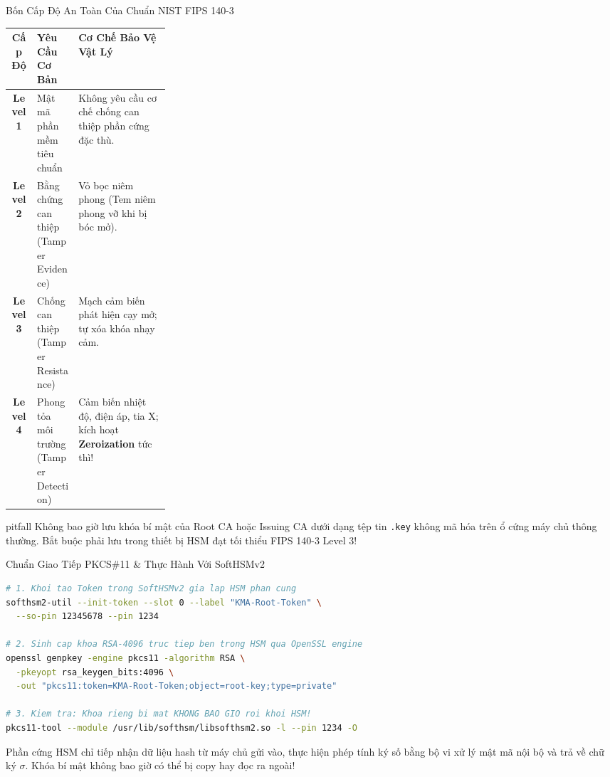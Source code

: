 \begin{frame}{Bốn Cấp Độ An Toàn Của Chuẩn NIST FIPS 140-3}
  \begin{table}[h]
    \centering\scriptsize
    \begin{tabularx}{\linewidth}{@{}c p{0.26\linewidth} X@{}}
      \toprule
      \textbf{Cấp Độ} & \textbf{Yêu Cầu Cơ Bản} & \textbf{Cơ Chế Bảo Vệ Vật Lý} \\
      \midrule
      \textbf{Level 1} & Mật mã phần mềm tiêu chuẩn & Không yêu cầu cơ chế chống can thiệp phần cứng đặc thù. \\
      \textbf{Level 2} & Bằng chứng can thiệp (Tamper Evidence) & Vỏ bọc niêm phong (Tem niêm phong vỡ khi bị bóc mở). \\
      \textbf{Level 3} & Chống can thiệp (Tamper Resistance) & Mạch cảm biến phát hiện cạy mở; tự xóa khóa nhạy cảm. \\
      \textbf{Level 4} & Phong tỏa môi trường (Tamper Detection) & Cảm biến nhiệt độ, điện áp, tia X; kích hoạt \textbf{Zeroization} tức thì! \\
      \bottomrule
    \end{tabularx}
  \end{table}

  \begin{beyond}{pitfall}
    Không bao giờ lưu khóa bí mật của Root CA hoặc Issuing CA dưới dạng tệp tin \texttt{.key} không mã hóa trên ổ cứng máy chủ thông thường. Bắt buộc phải lưu trong thiết bị HSM đạt tối thiểu FIPS 140-3 Level 3!
  \end{beyond}
\end{frame}

\begin{frame}[fragile]{Chuẩn Giao Tiếp PKCS\#11 \& Thực Hành Với SoftHSMv2}
  \begin{lstlisting}[language=bash]
# 1. Khoi tao Token trong SoftHSMv2 gia lap HSM phan cung
softhsm2-util --init-token --slot 0 --label "KMA-Root-Token" \
  --so-pin 12345678 --pin 1234

# 2. Sinh cap khoa RSA-4096 truc tiep ben trong HSM qua OpenSSL engine
openssl genpkey -engine pkcs11 -algorithm RSA \
  -pkeyopt rsa_keygen_bits:4096 \
  -out "pkcs11:token=KMA-Root-Token;object=root-key;type=private"

# 3. Kiem tra: Khoa rieng bi mat KHONG BAO GIO roi khoi HSM!
pkcs11-tool --module /usr/lib/softhsm/libsofthsm2.so -l --pin 1234 -O
  \end{lstlisting}

  \begin{keybox}
    Phần cứng HSM chỉ tiếp nhận dữ liệu hash từ máy chủ gửi vào, thực hiện phép tính ký số bằng bộ vi xử lý mật mã nội bộ và trả về chữ ký $\sigma$. Khóa bí mật không bao giờ có thể bị copy hay đọc ra ngoài!
  \end{keybox}
\end{frame}

